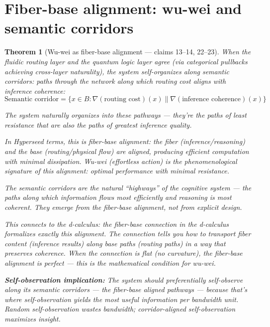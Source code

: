 \documentclass[11pt,a4paper]{article}
\newtheorem{theorem}[definition]{Theorem}
\begin{document}
\section{Fiber-base alignment: wu-wei and semantic corridors}
\label{sec:wuwei}

\begin{theorem}[Wu-wei as fiber-base alignment --- claims 13--14, 22--23]
\label{thm:wuwei}
When the fluidic routing layer and the quantum logic layer agree (via
categorical pullbacks achieving cross-layer naturality), the system
self-organizes along \emph{semantic corridors}: paths through the
network along which routing cost aligns with inference coherence:
\[
  \text{Semantic corridor} = \{x \in B : \nabla(\text{routing cost})(x)
  \parallel \nabla(\text{inference coherence})(x)\}
\]

The system naturally organizes into these pathways --- they're the paths
of least resistance that are also the paths of greatest inference quality.

In Hyperseed terms, this is \emph{fiber-base alignment}: the fiber
(inference/reasoning) and the base (routing/physical flow) are aligned,
producing efficient computation with minimal dissipation. Wu-wei
(effortless action) is the phenomenological signature of this alignment:
optimal performance with minimal resistance.

The semantic corridors are the natural ``highways'' of the cognitive
system --- the paths along which information flows most efficiently
and reasoning is most coherent. They emerge from the fiber-base
alignment, not from explicit design.

This connects to the d-calculus: the fiber-base connection in the
d-calculus formalizes exactly this alignment. The connection tells you
how to transport fiber content (inference results) along base paths
(routing paths) in a way that preserves coherence. When the connection
is flat (no curvature), the fiber-base alignment is perfect --- this is
the mathematical condition for wu-wei.

\textbf{Self-observation implication:} The system should preferentially
self-observe along its semantic corridors --- the fiber-base aligned
pathways --- because that's where self-observation yields the most
useful information per bandwidth unit. Random self-observation wastes
bandwidth; corridor-aligned self-observation maximizes insight.
\end{theorem}
\end{document}

